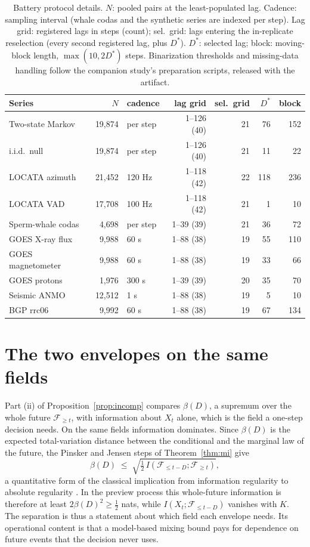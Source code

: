 \documentclass[acmsmall,screen,review,anonymous]{acmart}
\begin{document}
\begin{table}[h]\centering\footnotesize
\begin{tabular}{lrlrrrr}
\toprule
Series & $N$ & cadence & lag grid & sel.\ grid & $D^*$ & block \\
\midrule
Two-state Markov & 19,874 & per step & 1--126 (40) & 21 & 76 & 152 \\
i.i.d.\ null & 19,874 & per step & 1--126 (40) & 21 & 11 & 22 \\
LOCATA azimuth & 21,452 & 120 Hz & 1--118 (42) & 22 & 118 & 236 \\
LOCATA VAD & 17,708 & 100 Hz & 1--118 (42) & 21 & 1 & 10 \\
Sperm-whale codas & 4,698 & per step & 1--39 (39) & 21 & 36 & 72 \\
GOES X-ray flux & 9,988 & 60 s & 1--88 (38) & 19 & 55 & 110 \\
GOES magnetometer & 9,988 & 60 s & 1--88 (38) & 19 & 33 & 66 \\
GOES protons & 1,976 & 300 s & 1--39 (39) & 20 & 35 & 70 \\
Seismic ANMO & 12,512 & 1 s & 1--88 (38) & 19 & 5 & 10 \\
BGP rrc06 & 9,992 & 60 s & 1--88 (38) & 19 & 67 & 134 \\
\bottomrule
\end{tabular}
\caption{Battery protocol details. $N$: pooled pairs at the least-populated lag. Cadence: sampling interval (whale codas and the synthetic series are indexed per step). Lag grid: registered lags in steps (count); sel.\ grid: lags entering the in-replicate reselection (every second
registered lag, plus $D^*$). $D^*$: selected lag; block: moving-block length, $\max(10,2D^*)$ steps. Binarization thresholds and missing-data handling follow the companion study's preparation scripts, released with the artifact.}
\label{tab:details}
\end{table}

\FloatBarrier
\section{The two envelopes on the same fields}\label{app:samefield}

Part (ii) of Proposition~\ref{prop:incomp} compares $\beta(D)$, a supremum
over the whole future $\mathcal F_{\ge t}$, with information about $X_t$
alone, which is the field a one-step decision needs. On the same fields
information dominates. Since $\beta(D)$ is the expected total-variation
distance between the conditional and the marginal law of the future, the
Pinsker and Jensen steps of Theorem~\ref{thm:mi} give
\[
\beta(D)\;\le\;\sqrt{\tfrac12\,I(\mathcal F_{\le t-D};\mathcal F_{\ge t})},
\]
a quantitative form of the classical implication from information
regularity to absolute regularity \cite[Sec.~2]{bradley05}. In the preview
process this whole-future information is therefore at least
$2\beta(D)^2\ge\tfrac12$ nats, while $I(X_t;\mathcal F_{\le t-D})$ vanishes
with $K$. The separation is thus a statement about which field each
envelope needs. Its operational content is that a model-based mixing bound
pays for dependence on future events that the decision never uses.
\end{document}
